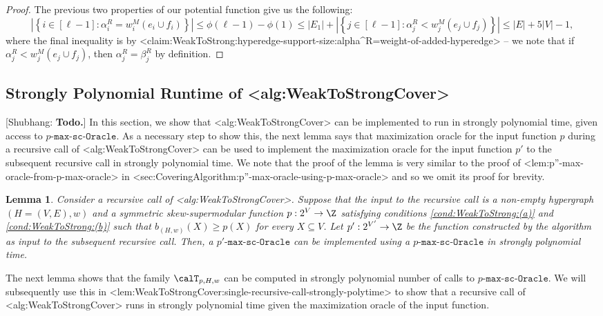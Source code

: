 \documentclass{article}
\def\Cref#1{<#1>}%
\newtheorem{lemma}{Lemma}[section]
\newcommand{\functionMaximizationOracleStrongCover}[1]{\ensuremath{{#1}\text{-}\mathtt{max}\text{-}\mathtt{sc}\text{-}\mathtt{Oracle}}\xspace}
\newcommand{\maximalTightSetFamily}[1]{\ensuremath{\calT_{#1}}\xspace}
\newcommand{\shubhang}[1]{{\color{blue}[{\tiny Shubhang: \bf #1}]\marginpar{\color{blue}*}}}
\newcommand{\kristof}[1]{{\color{purple}[{\tiny Kristof: \bf #1}]\marginpar{\color{red}*}}}
\begin{document}
\begin{proof}
      The previous two properties of our potential function give us the following:
      $$\left|\left\{i \in [\ell - 1] : \alpha_i^R = w_i^M(e_i \cup f_i)\right\}\right| \leq \phi(\ell - 1) - \phi(1) \leq |E_1| + \left|\left\{j \in [\ell - 1] : \alpha_j^R < w_j^M(e_j\cup f_j)\right\}\right| \leq |E| + 5|V| - 1,$$ 
      where the final inequality is by \Cref{claim:WeakToStrong:hyperedge-support-size:alpha^R=weight-of-added-hyperedge} -- we note that if $\alpha_j^R < w_j^M(e_j\cup f_j)$, then $\alpha_j^R = \beta_j^R$ by definition.
\end{proof}

\iffalse
\subsection{Strongly Polynomial Runtime of \Cref{alg:WeakToStrongCover}}\label{sec:WeakToStrongCover:strongly-poly-runtime:main}
\shubhang{Todo.}
In this section, we show that \Cref{alg:WeakToStrongCover} can be implemented to run in strongly polynomial time, given access to \functionMaximizationOracleStrongCover{p}. As a necessary step to show this, the next lemma says that maximization oracle for the input function $p$ during a recursive call of \Cref{alg:WeakToStrongCover} can be used to implement the maximization oracle for the input function $p'$ to the subsequent recursive call in strongly polynomial time. We note that the proof of the lemma is very similar to the proof of \Cref{lem:p''-max-oracle-from-p-max-oracle} in \Cref{sec:CoveringAlgorithm:p''-max-oracle-using-p-max-oracle} and so we omit its proof for brevity.

\begin{lemma}\label{lem:WeakToStrong:p'-oracle-from-p-oracle}
Consider a recursive call of \Cref{alg:WeakToStrongCover}. Suppose that the input to the recursive call is a non-empty hypergraph $(H = (V, E), w)$ and a symmetric skew-supermodular function $p:2^V\rightarrow \Z$ satisfying conditions \ref{cond:WeakToStrong:(a)} and \ref{cond:WeakToStrong:(b)} such that $b_{(H,w)}(X) \geq p(X)$ for every $X \subseteq V$. Let $p':2^{V'}\rightarrow\Z$ be the function constructed by the algorithm as input to the subsequent recursive call. 
Then, a  \functionMaximizationOracleStrongCover{p'} can be implemented using a  \functionMaximizationOracleStrongCover{p} in strongly polynomial time.
\end{lemma}

The next lemma shows that the family $\maximalTightSetFamily{p, H, w}$ can be computed in strongly polynomial number of calls to \functionMaximizationOracleStrongCover{p}. We will subsequently use this in \Cref{lem:WeakToStrongCover:single-recursive-call-strongly-polytime} to show that a recursive call of \Cref{alg:WeakToStrongCover} runs in strongly polynomial time given the maximization oracle of the input function.
\end{document}
